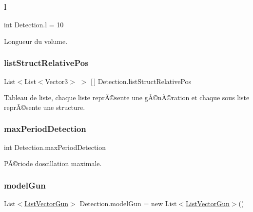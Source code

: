 \subsubsection{\texorpdfstring{l}{l}}
{\footnotesize\ttfamily int Detection.\+l = 10\hspace{0.3cm}{\ttfamily [private]}}



Longueur du volume. 

\mbox{\label{class_detection_a8fb631a5ff0dfc9604e0efb5662b98ad}} 
\subsubsection{\texorpdfstring{list\+Struct\+Relative\+Pos}{listStructRelativePos}}
{\footnotesize\ttfamily List$<$List$<$Vector3$>$ $>$ \mbox{[}$\,$\mbox{]} Detection.\+list\+Struct\+Relative\+Pos\hspace{0.3cm}{\ttfamily [private]}}



Tableau de liste, chaque liste reprÃ©sente une gÃ©nÃ©ration et chaque sous liste reprÃ©sente une structure. 

\mbox{\label{class_detection_a98167fc0f3e26398cfd51f95b6a64e72}} 
\subsubsection{\texorpdfstring{max\+Period\+Detection}{maxPeriodDetection}}
{\footnotesize\ttfamily int Detection.\+max\+Period\+Detection\hspace{0.3cm}{\ttfamily [private]}}



PÃ©riode d\textquotesingle{}oscillation maximale. 

\mbox{\label{class_detection_ae14cf1144858a30db9892e36723e9795}} 
\subsubsection{\texorpdfstring{model\+Gun}{modelGun}}
{\footnotesize\ttfamily List$<$\mbox{\hyperlink{class_list_vector_gun}{List\+Vector\+Gun}}$>$ Detection.\+model\+Gun = new List$<$\mbox{\hyperlink{class_list_vector_gun}{List\+Vector\+Gun}}$>$()\hspace{0.3cm}{\ttfamily [private]}}

